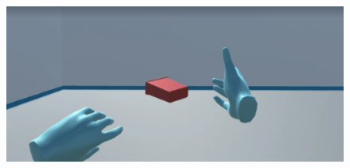 \begin{itemize}
\begin{figure}[H]
\begin{center}
       	\end{center} 
    \end{figure}
    \begin{figure}[H]
        \begin{center}
            \includegraphics[width = .7\textwidth]{source/images/image43.png}
        \end{center} 
    \end{figure}
\end{itemize}

